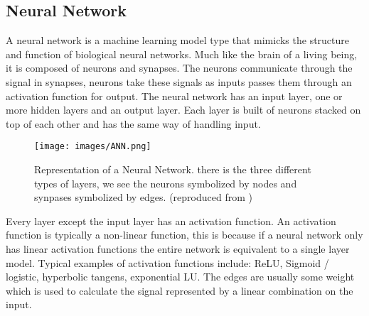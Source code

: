 \documentclass[a4paper,12pt]{article}
\begin{document}
\subsection{Neural Network}
A neural network is a machine learning model type that mimicks the structure and function of biological neural networks. Much like the brain of a living being, it is composed of neurons and synapses. The neurons communicate through the signal in synapses, neurons take these signals as inputs passes them through an activation function for output.
The neural network has an input layer, one or more hidden layers and an output layer. Each layer is built of neurons stacked on top of each other and has the same way of handling input.
\begin{figure}[H]
  \centering
  \texttt{[image: images/ANN.png]}
  \caption{Representation of a Neural Network. there is the three different types of layers, we see the neurons symbolized by nodes and synpases symbolized by edges. (reproduced from \cite{glosser_ann})} %
  \label{fig:n1}
\end{figure}
Every layer except the input layer has an activation function. An activation function is typically a non-linear function, this is because if a neural network only has linear activation functions the entire network is equivalent to a single layer model.
Typical examples of activation functions include: ReLU, Sigmoid / logistic, hyperbolic tangens, exponential LU. The edges are usually some weight which is used to calculate the signal represented by a linear combination on the input.
\end{document}
